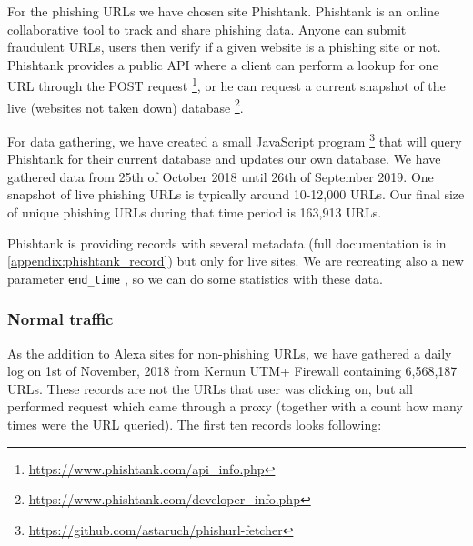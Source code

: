 \documentclass[
  digital, %
  oneside, %
  table,   %
  nolof,     %
  nolot,     %
]{fithesis3}
\begin{document}
For the phishing URLs we have chosen site Phishtank. Phishtank \cite{phishtank} \label{section:phishtank} is an online collaborative tool to track and share phishing data. Anyone can submit fraudulent URLs, users then verify if a given website is a phishing site or not. Phishtank provides a public API  where a client can perform a lookup for one URL through the POST request \footnote{\url{https://www.phishtank.com/api\_info.php}}, or he can request a current snapshot of the live (websites not taken down) database \footnote{\url{https://www.phishtank.com/developer\_info.php}}. 

For data gathering, we have created a small JavaScript program  \footnote{\url{https://github.com/astaruch/phishurl-fetcher}} that will query Phishtank for their current database and updates our own database. We have gathered data from 25th of October 2018 until 26th of September 2019. One snapshot of live phishing URLs is typically around 10-12,000 URLs. Our final size of unique phishing URLs during that time period is 163,913 URLs.

Phishtank is providing records with several metadata (full documentation is in \ref{appendix:phishtank_record}) but only for live sites. We are recreating also a new parameter \texttt{end\_time} , so we can do some statistics with these data.

\subsubsection{Normal traffic}

As the addition to Alexa sites for non-phishing URLs, we have gathered a daily log on 1st of November, 2018 from Kernun UTM+ Firewall containing 6,568,187 URLs. These records are not the URLs that user was clicking on, but all performed request which came through a proxy (together with a count how many times were the URL queried). The first ten records looks following:
\end{document}
